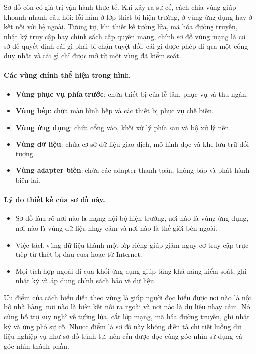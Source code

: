 \documentclass[11pt,a4paper]{article}
\begin{document}
Sơ đồ còn có giá trị vận hành thực tế. Khi xảy ra sự cố, cách chia vùng giúp khoanh nhanh câu hỏi: lỗi nằm ở lớp thiết bị hiện trường, ở vùng ứng dụng hay ở kết nối với hệ ngoài. Tương tự, khi thiết kế tường lửa, mã hóa đường truyền, nhật ký truy cập hay chính sách cấp quyền mạng, chính sơ đồ vùng mạng là cơ sở để quyết định cái gì phải bị chặn tuyệt đối, cái gì được phép đi qua một cổng duy nhất và cái gì chỉ được mở từ một vùng đã kiểm soát.

\paragraph{Các vùng chính thể hiện trong hình.}
\begin{itemize}
  \item \textbf{Vùng phục vụ phía trước}: chứa thiết bị của lễ tân, phục vụ và thu ngân.
  \item \textbf{Vùng bếp}: chứa màn hình bếp và các thiết bị phục vụ chế biến.
  \item \textbf{Vùng ứng dụng}: chứa cổng vào, khối xử lý phía sau và bộ xử lý nền.
  \item \textbf{Vùng dữ liệu}: chứa cơ sở dữ liệu giao dịch, mô hình đọc và kho lưu trữ đối tượng.
  \item \textbf{Vùng adapter biên}: chứa các adapter thanh toán, thông báo và phát hành biên lai.
\end{itemize}

\paragraph{Lý do thiết kế của sơ đồ này.}
\begin{itemize}
  \item Sơ đồ làm rõ nơi nào là mạng nội bộ hiện trường, nơi nào là vùng ứng dụng, nơi nào là vùng dữ liệu nhạy cảm và nơi nào là thế giới bên ngoài.
  \item Việc tách vùng dữ liệu thành một lớp riêng giúp giảm nguy cơ truy cập trực tiếp từ thiết bị đầu cuối hoặc từ Internet.
  \item Mọi tích hợp ngoài đi qua khối ứng dụng giúp tăng khả năng kiểm soát, ghi nhật ký và áp dụng chính sách bảo vệ dữ liệu.
\end{itemize}

Ưu điểm của cách biểu diễn theo vùng là giúp người đọc hiểu được nơi nào là nội bộ nhà hàng, nơi nào là biên kết nối ra ngoài và nơi nào là dữ liệu nhạy cảm. Nó cũng hỗ trợ suy nghĩ về tường lửa, cắt lớp mạng, mã hóa đường truyền, ghi nhật ký và ứng phó sự cố. Nhược điểm là sơ đồ này không diễn tả chi tiết luồng dữ liệu nghiệp vụ như sơ đồ trình tự, nên cần được đọc cùng góc nhìn sử dụng và góc nhìn thành phần.
\end{document}
